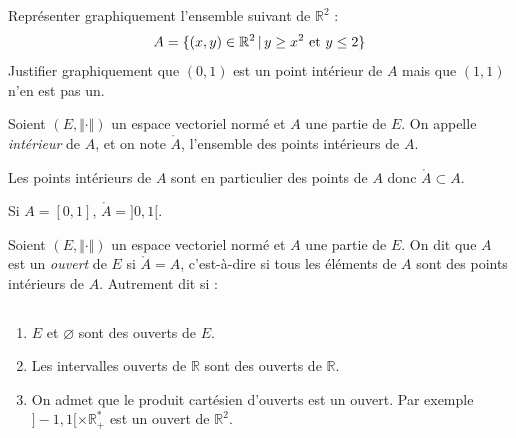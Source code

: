 \documentclass[french,11pt,twoside]{VcCours}
\begin{document}
\begin{ApplicationDirecte} Représenter graphiquement l'ensemble suivant de $\mathbb{R}^2$ :
$$ A= \lbrace (x,y) \in \mathbb{R}^2 \, \vert \,  y \geq x^2 \hbox{ et } y \leq 2 \rbrace$$
Justifier graphiquement que $(0,1)$ est un point intérieur de $A$ mais que $(1,1)$ n'en est pas un.
\end{ApplicationDirecte}

\begin{Definition}{} Soient $(E, \Vert \cdot \Vert)$ un espace vectoriel normé et $A$ une partie de $E$. On appelle \emph{intérieur} de $A$, et on note $\mathring{A}$, l'ensemble des points intérieurs de $A$.
\end{Definition}

\begin{Remarque}{} Les points intérieurs de $A$ sont en particulier des points de $A$ donc $\mathring{A} \subset A$.
\end{Remarque}

\begin{Exemple} Si $A=[0,1]$, $\mathring{A} = ]0,1[$.
\end{Exemple}

\begin{Definition}{}
Soient $(E, \Vert \cdot \Vert)$ un espace vectoriel normé et $A$ une partie de $E$. On dit que $A$ est un \emph{ouvert} de $E$ si $\mathring{A}=A$, c'est-à-dire si tous les éléments de $A$ sont des points intérieurs de $A$. Autrement dit si :
$$ \phantom{\forall a \in A, \, \exists r>0 \, \vert \, B(a,r) \subset A}$$
\end{Definition}
%

\begin{Exemples}
\begin{enumerate}
\item $E$ et $\varnothing$ sont des ouverts de $E$.
\item Les intervalles ouverts de $\mathbb{R}$ sont des ouverts de $\mathbb{R}$.
\item On admet que le produit cartésien d'ouverts est un ouvert. Par exemple $]-1,1[ \times \mathbb{R}_{+}^*$ est un ouvert de $\mathbb{R}^2$.
\end{enumerate}
\end{Exemples}
\end{document}
